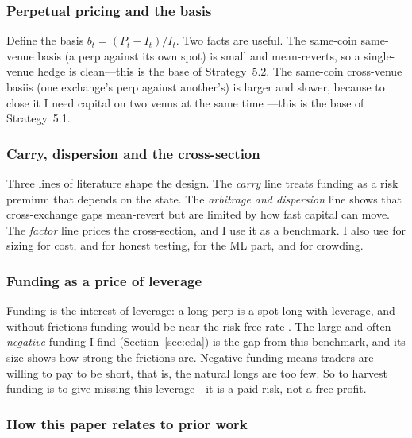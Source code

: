 \documentclass[10pt,twocolumn,a4paper]{article}
\begin{document}
\subsubsection{Perpetual pricing and the basis}

Define the basis $b_t = (P_t - I_t)/I_t$.  Two facts are useful.  The same-coin
same-venue basis (a perp against its own spot) is small and mean-reverts, so a
single-venue hedge is clean---this is the base of Strategy~5.2.  The same-coin
cross-venue basiis (one exchange's perp against another's) is larger and slower,
because to close it I need capital on two venus at the same time
\cite{makarov2020trading}---this is the base of Strategy~5.1.

\subsubsection{Carry, dispersion and the cross-section}

Three lines of literature shape the design.  The \emph{carry} line
\cite{schmeling2023crypto} treats funding as a risk premium that depends on the state.
The \emph{arbitrage and dispersion} line \cite{makarov2020trading} shows that
cross-exchange gaps mean-revert but are limited by how fast capital can move.  The
\emph{factor} line \cite{liu2022common, borri2022cross} prices the cross-section, and
I use it as a benchmark.  I also use \cite{moreira2017volatility} for sizing
\cite{almgren2001optimal} for cost, \cite{foucault2017toxic} and
\cite{bailey2014deflated} for honest testing, \cite{sebastiao2021forecasting} for the
ML part, and \cite{hu2023crypto} for crowding.

\subsubsection{Funding as a price of leverage}

Funding is the interest of leverage: a long perp is a spot long with leverage, and
without frictions funding would be near the risk-free rate \cite{ackerer2024perpetual}.
The large and often \emph{negative} funding I find (Section~\ref{sec:eda}) is the gap
from this benchmark, and its size shows how strong the frictions are.  Negative
funding means traders are willing to pay to be short, that is, the natural longs are
too few.  So to harvest funding is to give missing this leverage---it is a paid risk,
not a free profit.

\subsubsection{How this paper relates to prior work}
\end{document}
